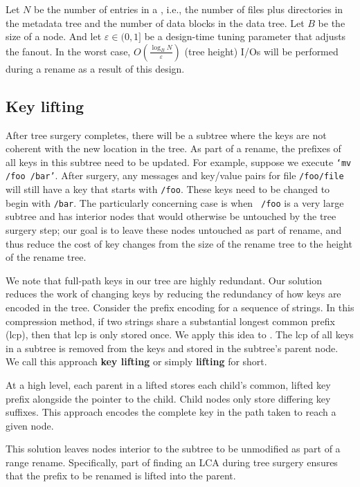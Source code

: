Let $N$ be the number of entries in a \bet, i.e., the number of files plus
directories in the metadata tree and the number of data blocks in the data tree.
Let $B$ be the size of a node.
And let $\varepsilon\in(0,1]$ be a design-time tuning parameter that adjusts the
fanout.
In the worst case, $O(\frac{\log_B{N}}{\varepsilon})$ (tree height)
I/Os will be performed  during a rename as a result of this design.

\subsection{Key lifting}

After tree surgery completes, there will be a subtree where the keys
are not coherent with the new location in the tree.  As part of a
rename, the prefixes of all keys in this subtree need to be updated.
For example, suppose we execute \texttt{`mv /foo /bar'}.  After surgery,
any messages and
key/value pairs for file \texttt{/foo/file} will still have a key that
starts with \texttt{/foo}.  These keys need to be changed to begin
with \texttt{/bar}.  The particularly concerning case is when {\tt
  /foo} is a very large subtree and has interior nodes that would
otherwise be untouched by the tree surgery step; our goal is to leave
these nodes untouched as part of rename, and thus reduce the cost of
key changes from the size of the rename tree to the height of the
rename tree.

We note that full-path keys in our tree are highly redundant.
Our solution
reduces the work of changing keys by reducing the redundancy of how
keys are encoded in the tree.
Consider the prefix encoding for a sequence
of strings.  In this compression method, if two strings share a
substantial longest common prefix (lcp), then that lcp is only stored
once.  We apply this idea to \bets. %
The lcp of all keys in a subtree is removed from the keys and stored in the
subtree's parent node.
We call this approach \textbf{key lifting} or
simply \textbf{lifting} for short.

At a high level, each parent in a lifted \bet stores
each child's common, lifted key prefix alongside the pointer to the child.
Child nodes only store differing key suffixes.
This approach encodes the complete key in the path taken to reach a given node.

This solution leaves nodes interior to the subtree to be unmodified as part of a range rename.
Specifically, part of finding an LCA during tree surgery ensures that the prefix to be renamed
is lifted into the parent.

